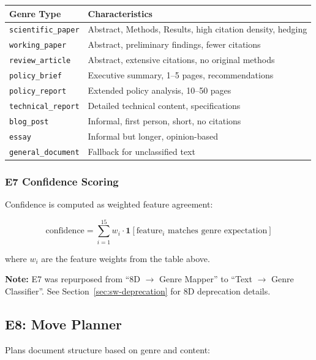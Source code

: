 \begin{center}
\begin{tabular}{lp{8cm}}
\toprule
Genre Type & Characteristics \\
\midrule
\texttt{scientific\_paper} & Abstract, Methods, Results, high citation density, hedging \\
\texttt{working\_paper} & Abstract, preliminary findings, fewer citations \\
\texttt{review\_article} & Abstract, extensive citations, no original methods \\
\texttt{policy\_brief} & Executive summary, 1--5 pages, recommendations \\
\texttt{policy\_report} & Extended policy analysis, 10--50 pages \\
\texttt{technical\_report} & Detailed technical content, specifications \\
\texttt{blog\_post} & Informal, first person, short, no citations \\
\texttt{essay} & Informal but longer, opinion-based \\
\texttt{general\_document} & Fallback for unclassified text \\
\bottomrule
\end{tabular}
\end{center}

\subsubsection{E7 Confidence Scoring}

Confidence is computed as weighted feature agreement:

\begin{equation}
\text{confidence} = \sum_{i=1}^{15} w_i \cdot \mathbf{1}[\text{feature}_i \text{ matches genre expectation}]
\end{equation}

where $w_i$ are the feature weights from the table above.

\textbf{Note:} E7 was repurposed from ``8D $\rightarrow$ Genre Mapper'' to ``Text $\rightarrow$ Genre Classifier''. See Section~\ref{sec:sw-deprecation} for 8D deprecation details.

\subsection{E8: Move Planner}
\label{sec:sw-e8}

Plans document structure based on genre and content:

